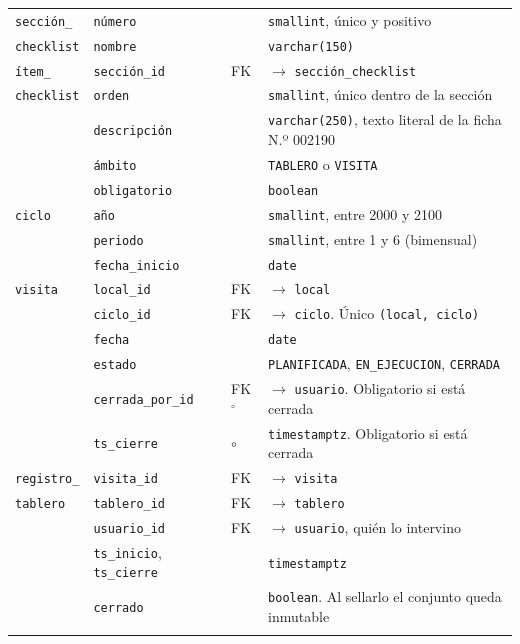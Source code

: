 \documentclass[10pt,letterpaper]{article}
\begin{document}
\begin{longtable}{@{}p{2.9cm}p{3.6cm}p{1.6cm}p{6.6cm}@{}}
\texttt{sección\_} & \texttt{número} & & \texttt{smallint}, único y positivo \\
\texttt{checklist} & \texttt{nombre} & & \texttt{varchar(150)} \\
\addlinespace

\texttt{ítem\_} & \texttt{sección\_id} & FK & $\to$ \texttt{sección\_checklist} \\
\texttt{checklist} & \texttt{orden} & & \texttt{smallint}, único dentro de la sección \\
 & \texttt{descripción} & & \texttt{varchar(250)}, texto literal de la ficha N.º 002190 \\
 & \texttt{ámbito} & & \texttt{TABLERO} o \texttt{VISITA} \\
 & \texttt{obligatorio} & & \texttt{boolean} \\
\addlinespace

\texttt{ciclo} & \texttt{año} & & \texttt{smallint}, entre 2000 y 2100 \\
 & \texttt{periodo} & & \texttt{smallint}, entre 1 y 6 (bimensual) \\
 & \texttt{fecha\_inicio} & & \texttt{date} \\
\addlinespace

\texttt{visita} & \texttt{local\_id} & FK & $\to$ \texttt{local} \\
 & \texttt{ciclo\_id} & FK & $\to$ \texttt{ciclo}. Único \texttt{(local, ciclo)} \\
 & \texttt{fecha} & & \texttt{date} \\
 & \texttt{estado} & & \texttt{PLANIFICADA}, \texttt{EN\_EJECUCION}, \texttt{CERRADA} \\
 & \texttt{cerrada\_por\_id} & FK$^\circ$ & $\to$ \texttt{usuario}. Obligatorio si está cerrada \\
 & \texttt{ts\_cierre} & $\circ$ & \texttt{timestamptz}. Obligatorio si está cerrada \\
\addlinespace

\texttt{registro\_} & \texttt{visita\_id} & FK & $\to$ \texttt{visita} \\
\texttt{tablero} & \texttt{tablero\_id} & FK & $\to$ \texttt{tablero} \\
 & \texttt{usuario\_id} & FK & $\to$ \texttt{usuario}, quién lo intervino \\
 & \texttt{ts\_inicio}, \texttt{ts\_cierre} & & \texttt{timestamptz} \\
 & \texttt{cerrado} & & \texttt{boolean}. Al sellarlo el conjunto queda inmutable \\
\addlinespace


\end{longtable}
\end{document}
